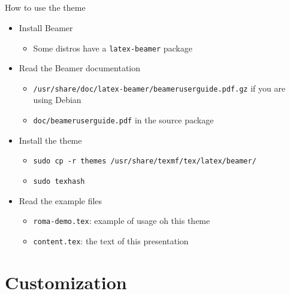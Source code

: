 \subsection{}
\begin{frame}[t,fragile]{How to use the theme}
\begin{itemize}
\item Install Beamer
  \begin{itemize}
  \item Some distros have a \verb!latex-beamer! package
  \end{itemize}
\item Read the Beamer documentation
  \begin{itemize}
  \item \verb!/usr/share/doc/latex-beamer/beameruserguide.pdf.gz! if you are
    using Debian
  \item \verb!doc/beameruserguide.pdf! in the source package
  \end{itemize}
\item Install the theme
  \begin{itemize}
  \item \verb!sudo cp -r themes /usr/share/texmf/tex/latex/beamer/!\\
  \item \verb!sudo texhash!
  \end{itemize}
\item Read the example files
  \begin{itemize}
  \item \verb!roma-demo.tex!: example of usage oh this theme
  \item \verb!content.tex!: the text of this presentation
  \end{itemize}
\end{itemize}
\end{frame}

\section{Customization}
